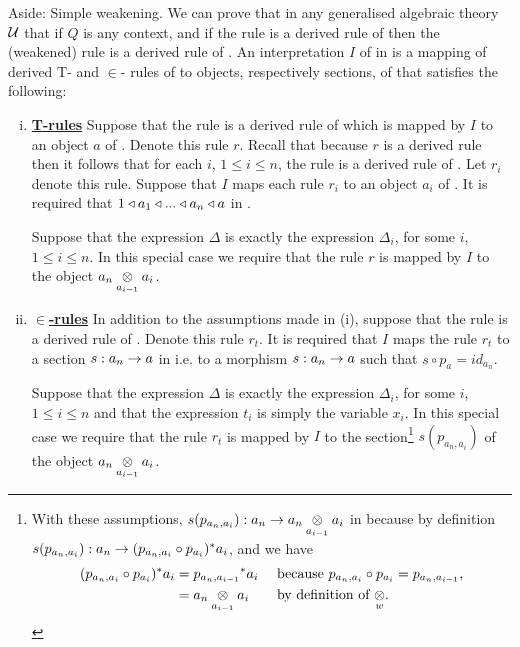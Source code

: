 \note Aside: Simple weakening. We can prove that in any generalised algebraic theory $\gatU$ that
if $Q$ is any context,
and if the rule  is a derived rule of \gatUw then
the (weakened) rule  is a derived rule of \gatU.
\note 
An interpretation $I$ of \gatUw in \catcw is a  mapping 
of derived T- and $\in$- rules of \gatUw to objects, respectively sections, of \gatUw that satisfies the following:
\begin{enumerate}[(i)]
\setlength\itemindent{2cm}
\item \underline{\textbf{T-rules}} 
Suppose that  the rule
 is a derived rule of \gatUw which is mapped by $I$ to an object $a$ of \catc. Denote this rule $r$. Recall that because $r$ is a derived rule then it follows  that for each $i$, 
$1 \leq i \leq n$, the rule  is a derived rule of \gatU. Let $r_i$ denote this rule.
Suppose that $I$ maps each rule $r_i$ to an object $a_i$ of \catcw.
It is required that $1 \base a_1 \base ... \base a_n \base a$ in \catc.

Suppose that the  expression $\Delta$ is exactly the expression $\Delta_i$, for some $i$, $1 \leq i \leq n$. In this special case we require that the rule $r$  is mapped by $I$ to the object 
$\crossx{a_n}{a_i}{a_{i-1}}$. 

\item \underline{\textbf{$\boldsymbol {\in}$-rules}} 
In addition to the assumptions made in (i),  suppose that the rule
 is a  derived rule of \gatU. 
Denote this rule $r_t$. It is required that $I$ maps the rule $r_t$ to a section
 $s:a_n \morph a$ in \catcw i.e. to a morphism $s:a_n \morph a$ such that $s \circ p_a = id_{a_n}$. 

Suppose that the  expression $\Delta$ is exactly the expression $\Delta_i$, for some $i$, $1 \leq i \leq n$ and that the expression $t_i$ is simply the variable $x_i$. 
In this special case we require that the rule $r_t$  is mapped by $I$ to the section\footnote{
With these assumptions, $s(p_{a_n,a_i}): a_n \morph \crossx{a_n}{a_i}{a_{i-1}}$ in \catcw because by definition  $s(p_{a_n,a_i}): a_n  \morph (p_{a_n,a_i} \circ p_{a_i})^*a_i$,
and we have 
\begin{align*}
(p_{a_n,a_i} \circ p_{a_i})^*a_i &= {p_{a_n,a_{i-1}}} ^* a_i  && \mbox{ because $p_{a_n,a_i} \circ p_{a_i}=p_{a_n,a_{i-1}}$,} \\
                                 &= \crossx{a_n}{a_i}{a_{i-1}} && \mbox{ by definition of $\crossx{}{}{w}$}.
\end{align*}
} %
$s(p_{a_n,a_i})$ of the object $\crossx{a_n}{a_i}{a_{i-1}}$. 


\end{enumerate}
